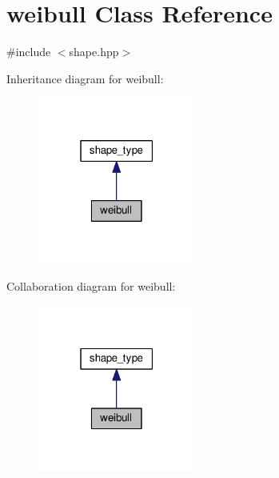\hypertarget{classweibull}{}\section{weibull Class Reference}
\label{classweibull}


{\ttfamily \#include $<$shape.\+hpp$>$}



Inheritance diagram for weibull\+:
\nopagebreak
\begin{figure}[H]
\begin{center}
\leavevmode
\includegraphics[width=147pt]{d2/d07/classweibull__inherit__graph}
\end{center}
\end{figure}


Collaboration diagram for weibull\+:
\nopagebreak
\begin{figure}[H]
\begin{center}
\leavevmode
\includegraphics[width=147pt]{db/d7a/classweibull__coll__graph}
\end{center}
\end{figure}

